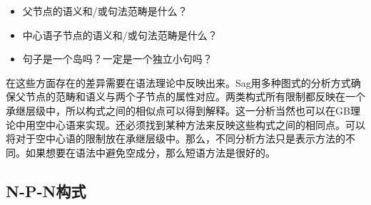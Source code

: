 \begin{exe}
\begin{xlist}[iv.]
\begin{exe}
\begin{xlist}[iv.]
\begin{itemize}
\item 父节点的语义和/或句法范畴是什么？
\item 中心语子节点的语义和/或句法范畴是什么？
\item 句子是一个岛吗？一定是一个独立小句吗？
\end{itemize}
在这些方面存在的差异需要在语法理论中反映出来。Sag用多种图式的分析方式确保父节点的范畴和语义与两个子节点的属性对应。两类构式所有限制都反映在一个承继层级中，所以构式之间的相似点可以得到解释。这一分析当然也可以在GB理论中用空中心语来实现。还必须找到某种方法来反映这些构式之间的相同点。可以将对于空中心语的限制放在承继层级中。那么，不同分析方法只是表示方法的不同。如果想要在语法中避免空成分，那么短语方法是很好的。

\subsection{N-P-N构式}
\label{Abschnitt-NPN-Konstruktion}


\end{xlist}
\end{exe}
\end{xlist}
\end{exe}
